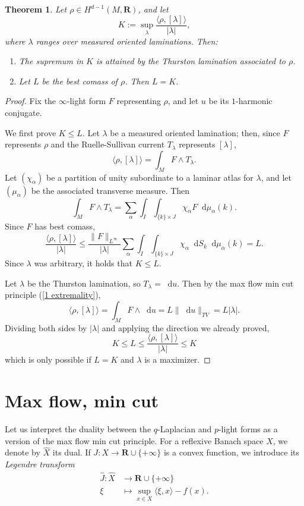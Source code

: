 \documentclass[reqno,11pt]{amsart}
\newcommand{\RR}{\mathbf{R}}
\newcommand*\dif{\mathop{}\!\mathrm{d}}
\newcommand{\dfn}[1]{\emph{#1}\index{#1}}
\newtheorem{theorem}{Theorem}[section]
\theoremstyle{definition}
\numberwithin{equation}{section}
\begin{document}
\begin{theorem}\label{L equals K}
	Let $\rho \in H^{d - 1}(M, \RR)$, and let 
	$$K := \sup_\lambda \frac{\langle \rho, [\lambda]\rangle}{|\lambda|},$$
	where $\lambda$ ranges over measured oriented laminations. Then:
\begin{enumerate}
	\item The supremum in $K$ is attained by the Thurston lamination associated to $\rho$.
	\item Let $L$ be the best comass of $\rho$. Then $L = K$.
\end{enumerate}
\end{theorem}
\begin{proof}
Fix the $\infty$-light form $F$ representing $\rho$, and let $u$ be its $1$-harmonic conjugate.

We first prove $K \leq L$.
Let $\lambda$ be a measured oriented lamination; then, since $F$ represents $\rho$ and the Ruelle-Sullivan current $T_\lambda$ represents $[\lambda]$,
$$\langle \rho, [\lambda]\rangle = \int_M F \wedge T_\lambda.$$
Let $(\chi_\alpha)$ be a partition of unity subordinate to a laminar atlas for $\lambda$, and let $(\mu_\alpha)$ be the associated transverse measure. Then 
$$\int_M F \wedge T_\lambda = \sum_\alpha \int_I \int_{\{k\} \times J} \chi_\alpha F \dif \mu_\alpha(k).$$
Since $F$ has best comass,
$$\frac{\langle \rho, [\lambda] \rangle}{|\lambda|}
\leq \frac{\|F\|_{L^\infty}}{|\lambda|} \sum_\alpha \int_I \int_{\{k\} \times J} \chi_\alpha \dif S_k \dif \mu_\alpha(k) = L.$$
Since $\lambda$ was arbitrary, it holds that $K \leq L$.

Let $\lambda$ be the Thurston lamination, so $T_\lambda = \dif u$.
Then by the max flow min cut principle (\ref{1 extremality}),
$$\langle \rho, [\lambda]\rangle = \int_M F \wedge \dif u = L \|\dif u\|_{TV} = L|\lambda|.$$
Dividing both sides by $|\lambda|$ and applying the direction we already proved,
$$K \leq L \leq \frac{\langle \rho, [\lambda]\rangle}{|\lambda|} \leq K$$
which is only possible if $L = K$ and $\lambda$ is a maximizer.
\end{proof}

\appendix 
\section{Max flow, min cut}\label{Max Flow Min Cut}
Let us interpret the duality between the $q$-Laplacian and $p$-light forms as a version of the max flow min cut principle. 
For a reflexive Banach space $X$, we denote by $\hat X$ its dual.
If $J: X \to \RR \cup \{+\infty\}$ is a convex function, we introduce its \dfn{Legendre transform}
\begin{align*}
	\hat J: \hat X &\to \RR \cup \{+\infty\}\\
	\xi &\mapsto \sup_{x \in X} \langle \xi, x\rangle - f(x).
\end{align*}
\end{document}

